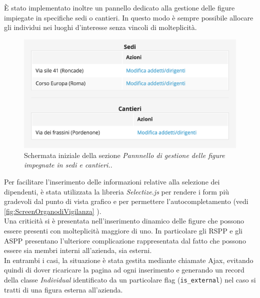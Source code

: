 	È stato implementato inoltre un pannello dedicato alla gestione delle figure impiegate in specifiche sedi o cantieri. In questo modo è sempre possibile allocare gli individui nei luoghi d'interesse senza vincoli di molteplicità.\\
	\begin{figure}[H]
		\begin{center}
			\includegraphics[width=12cm]{Pics/ScreenfigureDiCantiere.png}
			\caption{
				Schermata iniziale della sezione \textit{Pannnello di gestione delle figure impegnate in sedi e cantieri.}.}
			\label{fig:ScreenPrincipaleFigureSediCantieri}
		\end{center}
	\end{figure}

	Per facilitare l'inserimento delle informazioni relative alla selezione dei dipendenti, è stata utilizzata la libreria \textit{Selectize.js} per rendere i form più gradevoli dal punto di vista grafico e per permettere l'autocompletamento (vedi \autoref{fig:ScreenOrganodiVigilanza} ). \\ 
	Una criticità si è presentata nell'inserimento dinamico delle figure che possono essere presenti con molteplicità maggiore di uno. In particolare gli RSPP e gli ASPP presentano l'ulteriore complicazione rappresentata dal fatto che possono essere sia membri interni all'azienda, sia esterni. \\
	In entrambi i casi, la situazione è stata gestita mediante chiamate \gls{Ajax}, evitando quindi di dover ricaricare la pagina ad ogni inserimento e generando un record della classe \textit{Individual}  identificato da un particolare flag (\texttt{is\_external}) nel caso si tratti di una figura esterna all'azienda.\\
	
